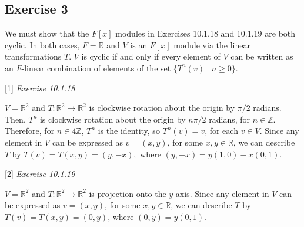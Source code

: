 \subsection*{Exercise 3}
We must show that the $F[x]$ modules in Exercises 10.1.18 and 10.1.19 are both cyclic. In both cases, $F = \mathbb{R}$ and $V$ is an $F[x]$ module via the linear transformations $T$. $V$ is cyclic if and only if every element of $V$ can be written as an $F$-linear combination of elements of the set $\{T^n(v) \mid n \ge 0\}$.

\vspace{5 mm}
[1] \textit{Exercise 10.1.18}

$V = \mathbb{R}^2$ and $T: \mathbb{R}^2 \rightarrow \mathbb{R}^2$ is clockwise rotation about the origin by $\pi/2$ radians. Then, $T^n$ is clockwise rotation about the origin by $n\pi/2$ radians, for $n \in \mathbb{Z}$. Therefore, for $n \in 4\mathbb{Z}$, $T^n$ is the identity, so $T^n(v) = v$, for each $v \in V$. Since any element in $V$ can be expressed as $v = (x,y)$, for some $x,y \in \mathbb{R}$, we can describe $T$ by $T(v) = T(x,y) = (y,-x),$ where $(y,-x) = y(1,0) - x(0,1)$.

\vspace{5 mm}
[2] \textit{Exercise 10.1.19}

$V = \mathbb{R}^2$ and $T: \mathbb{R}^2 \rightarrow \mathbb{R}^2$ is projection onto the $y$-axis. Since any element in $V$ can be expressed as $v = (x,y)$, for some $x,y \in \mathbb{R}$, we can describe $T$ by $T(v) = T(x,y) = (0,y)$, where $(0,y) = y(0,1)$.
